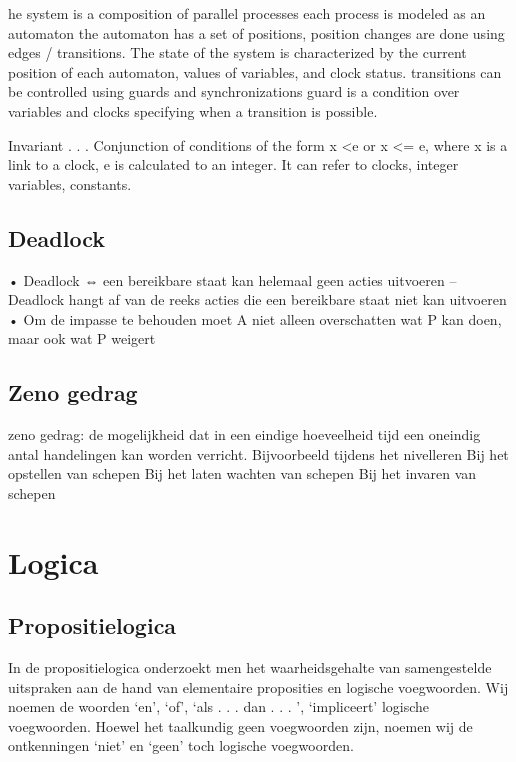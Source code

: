 \documentclass{article}
\begin{document}
	he system is a composition of parallel processes
	each process is modeled as an automaton
	the automaton has a set of positions,
	position changes are done using edges /
	transitions.
	The state of the system is characterized by
	the current
	position of each automaton,
	values of variables, and
	clock status.
	transitions can be controlled using guards
	and synchronizations
	guard is a condition over variables and clocks
	specifying when a transition is possible.
	
	
	Invariant . . . Conjunction of conditions of the form x <e or x <= e,
	where
	x is a link to a clock,
	e is calculated to an integer.
	It can refer to clocks, integer variables, constants.
	
 
	
	
	\subsection{Deadlock}
	• Deadlock ⇔ een bereikbare staat kan helemaal geen acties uitvoeren – Deadlock hangt af van de reeks acties die een bereikbare staat niet kan uitvoeren • Om de impasse te behouden moet A niet alleen overschatten wat P kan doen, maar ook wat P weigert
	\subsection{Zeno gedrag}
	zeno gedrag: de mogelijkheid dat in een eindige hoeveelheid tijd een oneindig antal handelingen kan worden verricht.
	Bijvoorbeeld tijdens het nivelleren
	Bij het opstellen van schepen
	Bij het laten wachten van schepen
	Bij het invaren van schepen
	
	\section{Logica}
	
	
	
	\subsection{Propositielogica}
	
	
	In de propositielogica onderzoekt men het waarheidsgehalte van samengestelde uitspraken
	aan de hand van elementaire proposities en logische voegwoorden. Wij noemen de
	woorden ‘en’, ‘of’, ‘als . . . dan . . . ’, ‘impliceert’ logische voegwoorden. Hoewel het taalkundig
	geen voegwoorden zijn, noemen wij de ontkenningen ‘niet’ en ‘geen’ toch logische
	voegwoorden.
	
\end{document}
